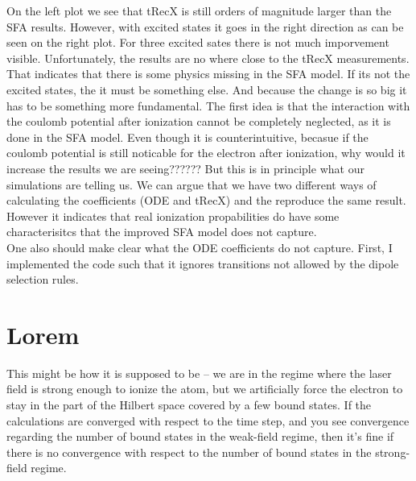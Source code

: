 On the left plot we see that tRecX is still orders of magnitude larger than the SFA results. 
However, with excited states it goes in the right direction as can be seen on the right plot. 
For three excited sates there is not much imporvement visible.
Unfortunately, the results are no where close to the tRecX measurements. That indicates that there is some physics missing in the SFA model.
If its not the excited states, the it must be something else.
And because the change is so big it has to be something more fundamental.
The first idea is that the interaction with the coulomb potential after ionization cannot be completely neglected, as it is done in the SFA model.
Even though it is counterintuitive, becasue if the coulomb potential is still noticable for the electron after ionization, why would it increase the results we are seeing??????
But this is in principle what our simulations are telling us. We can argue that we have two different ways of calculating the coefficients (ODE and tRecX) and the reproduce the same result.\\
However it indicates that real ionization propabilities do have some characterisitcs that the improved SFA model does not capture.\\
One also should make clear what the ODE coefficients do not capture. First, I implemented the code such that it ignores transitions not allowed by the dipole selection rules.



\section{Lorem}
This might be how it is supposed to be -- we are in the regime where the laser field is strong enough to ionize the atom, 
but we artificially force the electron to stay in the part of the Hilbert space covered by a few bound states. 
If the calculations are converged with respect to the time step, and you see convergence regarding the number of bound states in the weak-field regime, 
then it's fine if there is no convergence with respect to the number of bound states in the strong-field regime.







